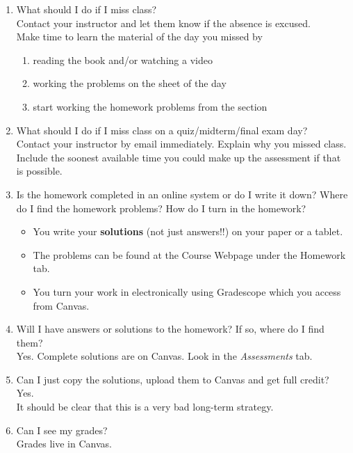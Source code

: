 \documentclass[11pt,fleqn]{article}
\begin{document}
\begin{enumerate}
\item What should I do if I miss class?\\
Contact your instructor and let them know if the absence is excused.\\
Make time to learn the material of the day you missed by 
\begin{enumerate}
	\item reading the book and/or watching a video
	\item working the problems on the sheet of the day
	\item start working the homework problems from the section
\end{enumerate}
\vfill

\item What should I do if I miss class on a quiz/midterm/final exam day?\\
Contact your instructor by email immediately. Explain why you missed class. Include the soonest available time you could make up the assessment if that is possible.
\vfill

\item Is the homework completed in an online system or do I write it down? Where do I find the homework problems? How do I turn in the homework?
\begin{itemize}
	\item You write your \textbf{solutions} (not just answers!!) on your paper or a tablet. 
	\item The problems can be found at the Course Webpage under the Homework tab. 
	\item You turn your work in electronically using Gradescope which you access from Canvas.
\end{itemize}
\vfill
\item Will I have answers or solutions to the homework? If so, where do I find them?\\
Yes. Complete solutions are on Canvas. Look in the \emph{Assessments} tab.
\vfill
\item Can I just copy the solutions, upload them to Canvas and get full credit? \\
Yes. \\
It should be clear that this is a very bad long-term strategy. 
\vfill
\item Can I see my grades?\\
Grades live in Canvas.
\vfill


\end{enumerate}
\end{document}
